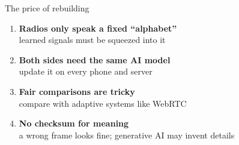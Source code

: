 \begin{frame}{The price of rebuilding}
  \vspace{0.8em}
  \begin{enumerate}[<+->]\itemsep8pt
    \item \textbf{Radios only speak a fixed ``alphabet''}\\
      {\small\textcolor{softgray}{learned signals must be squeezed into it}}
    \item \textbf{Both sides need the same AI model}\\
      {\small\textcolor{softgray}{update it on every phone and server}}
    \item \textbf{Fair comparisons are tricky}\\
      {\small\textcolor{softgray}{compare with adaptive systems like WebRTC}}
    \item \textbf{No checksum for meaning}\\
      {\small\textcolor{softgray}{a wrong frame looks fine; generative AI may
        invent details}}
  \end{enumerate}

  \vspace{1.0em}
\end{frame}
